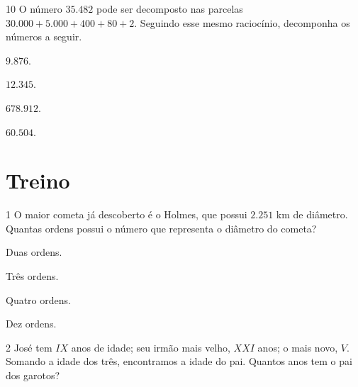 \num{10}  O número $35.482$ pode ser decomposto nas parcelas $30.000 + 5.000 +
400 + 80 + 2$. Seguindo esse mesmo raciocínio, decomponha os números a seguir.

\begin{escolha}
\item $9.876$.

\item $12.345$.

\item $678.912$.

\item $60.504$.

\end{escolha}

\section*{Treino}

\num{1} O maior cometa já descoberto é o Holmes, que possui $2.251$ km de
diâmetro. Quantas ordens possui o número que representa o diâmetro do cometa?

\begin{escolha}
\item Duas ordens.
\item Três ordens.
\item Quatro ordens.
\item Dez ordens.
\end{escolha}





\num{2} José tem $IX$ anos de idade; seu irmão mais velho, $XXI$ anos; 
o mais novo, $V$. Somando a idade dos três, encontramos a idade do pai.
Quantos anos tem o pai dos garotos?

